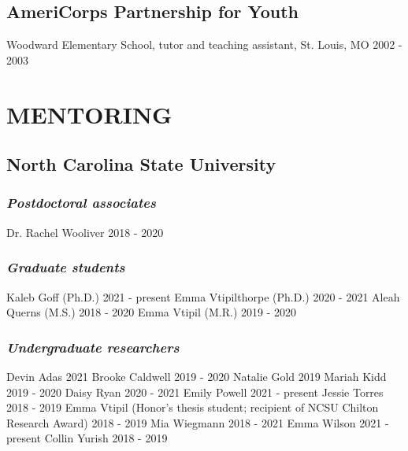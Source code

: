 \documentclass[11pt,english]{article}\usepackage[]{graphicx}\usepackage[]{color}
\begin{document}
\subsection*{AmeriCorps Partnership for Youth}
Woodward Elementary School, tutor and teaching assistant, St. Louis, MO \hfill {2002 - 2003} 

\section*{MENTORING}


\subsection*{North Carolina State University}
\subsubsection*{\emph{Postdoctoral associates}}
Dr. Rachel Wooliver \hfill {2018 - 2020}
\subsubsection*{\emph{Graduate students}}
Kaleb Goff (Ph.D.) \hfill {2021 - present} \newline
Emma Vtipilthorpe (Ph.D.) \hfill {2020 - 2021} \newline
Aleah Querns (M.S.) \hfill {2018 - 2020} \newline
Emma Vtipil (M.R.) \hfill {2019 - 2020}

\subsubsection*{\emph{Undergraduate researchers}}
Devin Adas \hfill {2021} \newline
Brooke Caldwell \hfill {2019 - 2020} \newline
Natalie Gold \hfill {2019} \newline
Mariah Kidd \hfill {2019 - 2020} \newline
Daisy Ryan \hfill {2020 - 2021} \newline 
Emily Powell \hfill {2021 - present} \newline 
Jessie Torres \hfill {2018 - 2019} \newline
Emma Vtipil (Honor's thesis student; recipient of NCSU Chilton Research Award) \hfill {2018 - 2019} \newline
Mia Wiegmann \hfill {2018 - 2021} \newline 
Emma Wilson \hfill {2021 - present} \newline 
Collin Yurish \hfill {2018 - 2019} 
\end{document}
